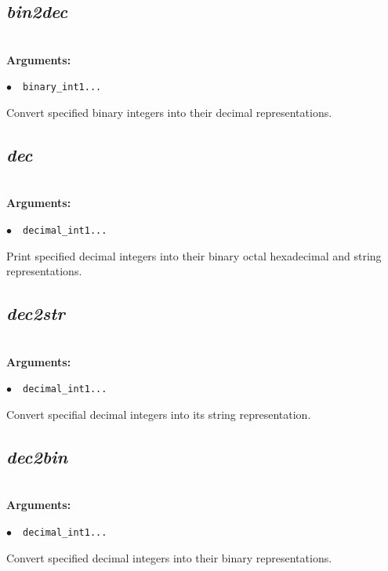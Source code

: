 \documentclass[a4paper,10.5pt,twoside]{book}
\def\comma{\discretionary{,}{}{,}}
\newcommand{\Cb}[1]{\textcolor{cb}{#1}}
\begin{document}
\subsection{\emph{bin2dec} }\vspace*{-0.7em}
~\\\textbf{\Cb{Arguments: }}\begin{flushleft}
{\small \Cb{\hspace*{0.5cm}$\bullet$~~\texttt{binary\_int1{\comma}...}}}\end{flushleft}
Convert specified binary integers into their decimal representations.


\subsection{\emph{dec} }\vspace*{-0.7em}
~\\\textbf{\Cb{Arguments: }}\begin{flushleft}
{\small \Cb{\hspace*{0.5cm}$\bullet$~~\texttt{decimal\_int1{\comma}...}}}\end{flushleft}
Print specified decimal integers into their binary{\comma} octal{\comma} hexadecimal and string representations.


\subsection{\emph{dec2str} }\vspace*{-0.7em}
~\\\textbf{\Cb{Arguments: }}\begin{flushleft}
{\small \Cb{\hspace*{0.5cm}$\bullet$~~\texttt{decimal\_int1{\comma}...}}}\end{flushleft}
Convert specifial decimal integers into its string representation.


\subsection{\emph{dec2bin} }\vspace*{-0.7em}
~\\\textbf{\Cb{Arguments: }}\begin{flushleft}
{\small \Cb{\hspace*{0.5cm}$\bullet$~~\texttt{decimal\_int1{\comma}...}}}\end{flushleft}
Convert specified decimal integers into their binary representations.
\end{document}
